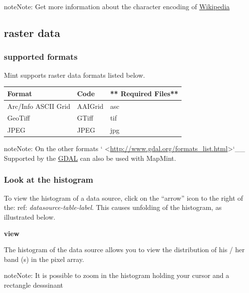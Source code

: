 \documentclass[letterpaper,10pt,english]{sphinxmanual}
\begin{document}
\begin{notice}{note}{Note:}
Get more information about the character encoding of \href{http://fr.wikipedia.org/wiki/Codage\_des\_caract\%C3\%A8res}{Wikipedia}
\end{notice}


\subsection{raster data}
\label{data/datasources:donnees-matricielles}

\subsubsection{supported formats}
\label{data/datasources:id1}
Mint supports raster data formats listed below.

\begin{tabulary}{\linewidth}{|L|L|L|}
\hline

\textbf{Format}
 & 
\textbf{Code}
 & 
** Required  Files**
\\
\hline
Arc/Info ASCII Grid
 & 
AAIGrid
 & 
asc
\\
\hline
GeoTiff
 & 
GTiff
 & 
tif
\\
\hline
JPEG
 & 
JPEG
 & 
jpg
\\
\hline\end{tabulary}


\begin{notice}{note}{Note:}
On the other formats {}` \textless{}\href{http://www.gdal.org/formats\_list.html}{http://www.gdal.org/formats\_list.html}\textgreater{}{}`\_\_ Supported by the \href{http://www.gdal.org}{GDAL} can also be used with MapMint.
\end{notice}


\subsubsection{Look at the histogram}
\label{data/datasources:consulter-l-histogramme}
To view the histogram of a data source, click on the ``arrow'' icon to the right of the: ref: \emph{datasource-table-label}. This causes unfolding of the histogram, as illustrated below.

{\color{red}\bfseries{}\textbar{}view\textbar{}}

The histogram of the data source allows you to view the distribution of his / her band (s) in the pixel array.

\begin{notice}{note}{Note:}
It is possible to zoom in the histogram holding your cursor and a rectangle desssinant
\end{notice}
\end{document}

